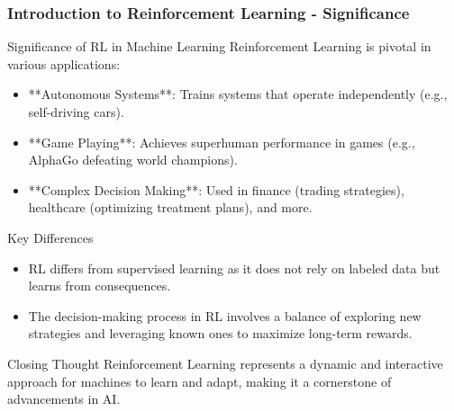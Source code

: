 \documentclass[aspectratio=169]{beamer}
\begin{document}
\begin{frame}[fragile]
    \frametitle{Introduction to Reinforcement Learning - Significance}
    \begin{block}{Significance of RL in Machine Learning}
        Reinforcement Learning is pivotal in various applications:
    \end{block}
    \begin{itemize}
        \item **Autonomous Systems**: Trains systems that operate independently (e.g., self-driving cars).
        \item **Game Playing**: Achieves superhuman performance in games (e.g., AlphaGo defeating world champions).
        \item **Complex Decision Making**: Used in finance (trading strategies), healthcare (optimizing treatment plans), and more.
    \end{itemize}
    
    \begin{block}{Key Differences}
        \begin{itemize}
            \item RL differs from supervised learning as it does not rely on labeled data but learns from consequences.
            \item The decision-making process in RL involves a balance of exploring new strategies and leveraging known ones to maximize long-term rewards.
        \end{itemize}
    \end{block}
    
    \begin{block}{Closing Thought}
        Reinforcement Learning represents a dynamic and interactive approach for machines to learn and adapt, making it a cornerstone of advancements in AI.
    \end{block}
\end{frame}
\end{document}
